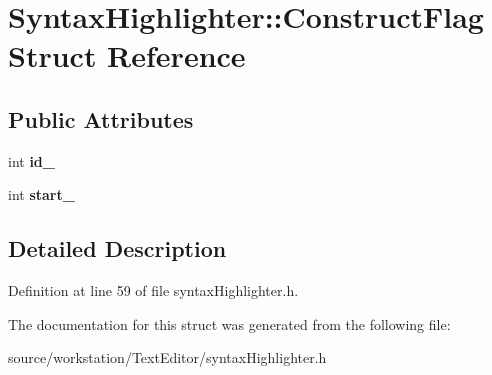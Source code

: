 \hypertarget{struct_syntax_highlighter_1_1_construct_flag}{\section{Syntax\-Highlighter\-:\-:Construct\-Flag Struct Reference}
\label{struct_syntax_highlighter_1_1_construct_flag}
}
\subsection*{Public Attributes}
\begin{DoxyCompactItemize}
\item 
\hypertarget{struct_syntax_highlighter_1_1_construct_flag_a2c8a847565db0b0787d683a5fdd46057}{int {\bfseries id\-\_\-}}\label{struct_syntax_highlighter_1_1_construct_flag_a2c8a847565db0b0787d683a5fdd46057}

\item 
\hypertarget{struct_syntax_highlighter_1_1_construct_flag_ad612aec2ea67dbbe93607a940a70c6ad}{int {\bfseries start\-\_\-}}\label{struct_syntax_highlighter_1_1_construct_flag_ad612aec2ea67dbbe93607a940a70c6ad}

\end{DoxyCompactItemize}


\subsection{Detailed Description}


Definition at line 59 of file syntax\-Highlighter.\-h.



The documentation for this struct was generated from the following file\-:\begin{DoxyCompactItemize}
\item 
source/workstation/\-Text\-Editor/syntax\-Highlighter.\-h\end{DoxyCompactItemize}
